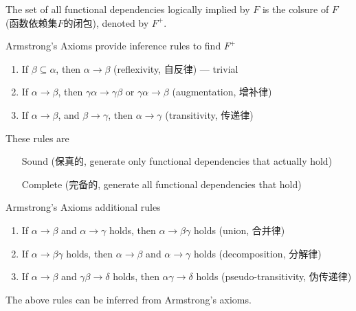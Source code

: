 \begin{definition}
    The set of all functional dependencies logically implied by $F$ is the colsure of $F$ (函数依赖集$F$的闭包), denoted by $F^+$. 
\end{definition}

Armstrong’s Axioms provide inference rules to find $F^+$
\begin{enumerate}\small
    \item If $\beta \subseteq \alpha$, then $\alpha \rightarrow \beta$ (reflexivity, 自反律) --- trivial
    \item If $\alpha \rightarrow \beta$, then $\gamma \alpha\rightarrow \gamma \beta$ or $\gamma \alpha \rightarrow \beta$ (augmentation, 增补律)
    \item If $\alpha \rightarrow \beta$, and $\beta\rightarrow \gamma$, then $\alpha \rightarrow \gamma$ (transitivity, 传递律)
\end{enumerate}
These rules are 
\begin{itemize}\small
    \item [Sound] (保真的, generate only functional dependencies that actually hold)
    \item [Complete] (完备的, generate all functional dependencies that hold)
\end{itemize}

Armstrong’s Axioms additional rules
\begin{enumerate}\small
    \item If $\alpha \rightarrow \beta$ and $\alpha \rightarrow \gamma$ holds, then $\alpha \rightarrow \beta \gamma$ holds (union, 合并律)
    \item If $\alpha \rightarrow \beta\gamma$ holds, then $\alpha \rightarrow \beta$ and $\alpha \rightarrow \gamma$ holds (decomposition, 分解律)
    \item If $\alpha \rightarrow \beta$ and $\gamma \beta \rightarrow \delta$ holds, then $\alpha \gamma \rightarrow \delta$ holds (pseudo-transitivity, 伪传递律)
\end{enumerate}
The above rules can be inferred from Armstrong’s axioms.

